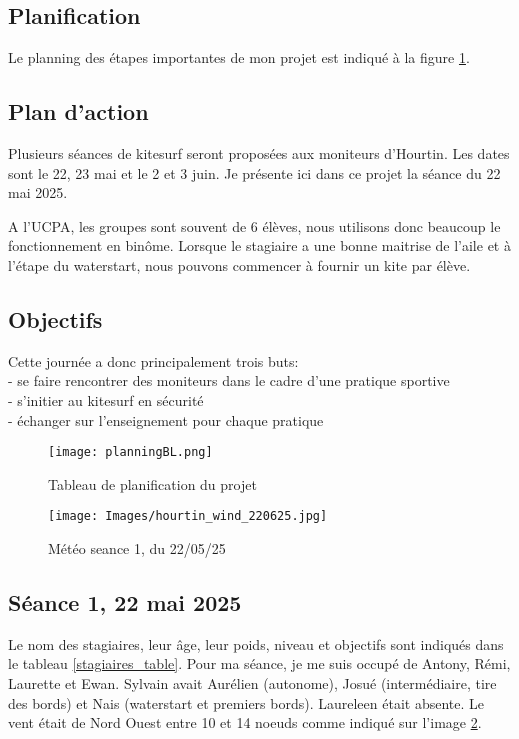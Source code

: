\documentclass[11pt,a4paper]{report}
\begin{document}
\subsection{Planification}
Le planning des étapes importantes de mon projet est indiqué
à la figure \ref{gantt}.
\subsection{Plan d'action}
Plusieurs séances de kitesurf seront proposées aux moniteurs d'Hourtin.
Les dates sont le 22, 23 mai et le 2 et 3 juin.
Je présente ici dans ce projet la séance du 22 mai 2025.

A l'UCPA, les groupes sont souvent de 6 élèves, nous
utilisons donc beaucoup le fonctionnement en bin\^ome. 
Lorsque le stagiaire a une bonne maitrise de l'aile et
à l'étape du waterstart, nous pouvons commencer à fournir
un kite par élève.
\subsection{Objectifs}
Cette journée a donc principalement trois buts:\\
- se faire rencontrer des moniteurs dans le cadre d'une pratique sportive \\
- s'initier au kitesurf en sécurité \\
- échanger sur l'enseignement pour chaque pratique \\

\begin{figure}
\centering
\texttt{[image: planningBL.png]} 
\caption{Tableau de planification du projet \label{gantt}}
\end{figure}
\begin{figure}
\texttt{[image: Images/hourtin\_wind\_220625.jpg]} 
\caption{Météo seance 1, du 22/05/25\label{meteo}}
\end{figure}
\subsection{Séance 1, 22 mai 2025}

Le nom des stagiaires, leur \^age, leur poids, niveau et objectifs sont
indiqués dans le tableau \ref{stagiaires_table}.
Pour ma séance, je me suis occupé de Antony, Rémi, Laurette et Ewan.
Sylvain avait Aurélien (autonome), Josué (intermédiaire, tire des bords)
et Nais (waterstart et premiers bords).
Laureleen était absente.
Le vent était de Nord Ouest entre 10 et 14 noeuds comme indiqué sur l'image \ref{meteo}.
\end{document}
